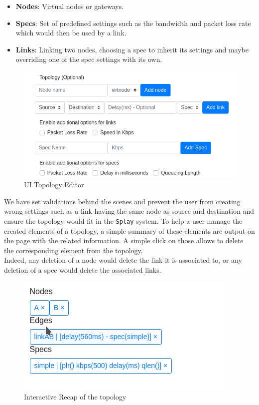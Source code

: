 \documentclass{eplmastersthesis}
\begin{document}
        \begin{itemize}
          \item \textbf{Nodes}: Virtual nodes or gateways.
          \item \textbf{Specs}: Set of predefined settings such as the
          bandwidth and packet loss rate which would then be used by
          a link.
          \item \textbf{Links}: Linking two nodes, choosing a spec to
          inherit its settings and maybe overriding one of the spec settings
          with its own.
        \end{itemize}

        \begin{figure}[H]
          \centering
          \includegraphics[scale=0.6]{figures/editor_topology.png}
          \caption{\label{editor_topology} UI Topology Editor}
        \end{figure}

        We have set validations behind the scenes and
        prevent the user from creating wrong settings such as a link having the
        same node as source and destination and ensure the topology would
        fit in the \texttt{Splay} system. To help a user manage the created
        elements of a topology, a simple summary of these elements are
        output on the page with the related information. A simple click on those
        allows to delete the corresponding element from the topology.\\
        Indeed, any deletion of a node would delete the link it is associated
        to, or any deletion of a spec would delete the associated links.\\

        \begin{figure}[H]
          \centering
          \includegraphics[scale=0.6]{figures/recap_topology.png}
          \caption{\label{recap_topology} Interactive Recap of the topology}
        \end{figure}
\end{document}
